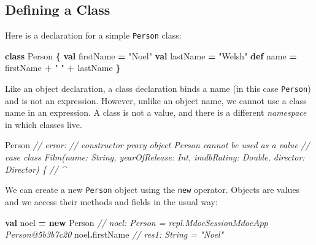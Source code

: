 \documentclass[11pt,a5paper,]{book}
\newenvironment{Shaded}{\begin{snugshade}}{\end{snugshade}}
\newcommand{\CommentTok}[1]{\textcolor[rgb]{0.56,0.35,0.01}{\textit{#1}}}
\newcommand{\KeywordTok}[1]{\textcolor[rgb]{0.13,0.29,0.53}{\textbf{#1}}}
\newcommand{\NormalTok}[1]{#1}
\newcommand{\OperatorTok}[1]{\textcolor[rgb]{0.81,0.36,0.00}{\textbf{#1}}}
\newcommand{\StringTok}[1]{\textcolor[rgb]{0.31,0.60,0.02}{#1}}
\begin{document}
\hypertarget{defining-a-class}{%
\subsection{Defining a Class}\label{defining-a-class}}

Here is a declaration for a simple \texttt{Person} class:

\begin{Shaded}
\begin{Highlighting}[]
\KeywordTok{class}\NormalTok{ Person }\OperatorTok{\{}
  \KeywordTok{val}\NormalTok{ firstName }\OperatorTok{=} \StringTok{"Noel"}
  \KeywordTok{val}\NormalTok{ lastName }\OperatorTok{=} \StringTok{"Welsh"}
  \KeywordTok{def}\NormalTok{ name }\OperatorTok{=}\NormalTok{ firstName }\OperatorTok{+} \StringTok{" "} \OperatorTok{+}\NormalTok{ lastName}
\OperatorTok{\}}
\end{Highlighting}
\end{Shaded}

Like an object declaration, a class declaration binds a name (in this
case \texttt{Person}) and is not an expression. However, unlike an
object name, we cannot use a class name in an expression. A class is not
a value, and there is a different \emph{namespace} in which classes
live.

\begin{Shaded}
\begin{Highlighting}[]
\NormalTok{Person}
\CommentTok{// error:}
\CommentTok{// constructor proxy object Person cannot be used as a value}
\CommentTok{// case class Film(name: String, yearOfRelease: Int, imdbRating: Double, director: Director) \{}
\CommentTok{//                              \^{}}
\end{Highlighting}
\end{Shaded}

We can create a new \texttt{Person} object using the \texttt{new}
operator. Objects are values and we access their methods and fields in
the usual way:

\begin{Shaded}
\begin{Highlighting}[]
\KeywordTok{val}\NormalTok{ noel }\OperatorTok{=} \KeywordTok{new}\NormalTok{ Person}
\CommentTok{// noel: Person = repl.MdocSession$MdocApp$Person@5b3b7c20}
\NormalTok{noel}\OperatorTok{.}\NormalTok{firstName}
\CommentTok{// res1: String = "Noel"}
\end{Highlighting}
\end{Shaded}
\end{document}
